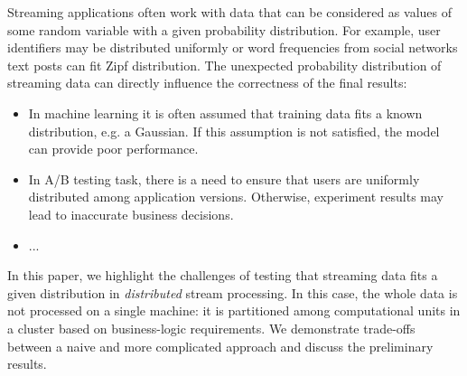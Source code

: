 \label {fs-short-intro}

Streaming applications often work with data that can be considered as values of some random variable with a given probability distribution. For example, user identifiers may be distributed uniformly or word frequencies from social networks text posts can fit Zipf distribution. The unexpected probability distribution of streaming data can directly influence the correctness of the final results:

\begin{itemize}
    \item In machine learning it is often assumed that training data fits a known distribution, e.g. a Gaussian. If this assumption is not satisfied, the model can provide poor performance.
    \item In A/B testing task, there is a need to ensure that users are uniformly distributed among application versions. Otherwise, experiment results may lead to inaccurate business decisions.
    \item ...
\end{itemize}

In this paper, we highlight the challenges of testing that streaming data fits a given distribution in {\em distributed} stream processing. In this case, the whole data is not processed on a single machine: it is partitioned among computational units in a cluster based on business-logic requirements. We demonstrate trade-offs between a naive and more complicated approach and discuss the preliminary results.